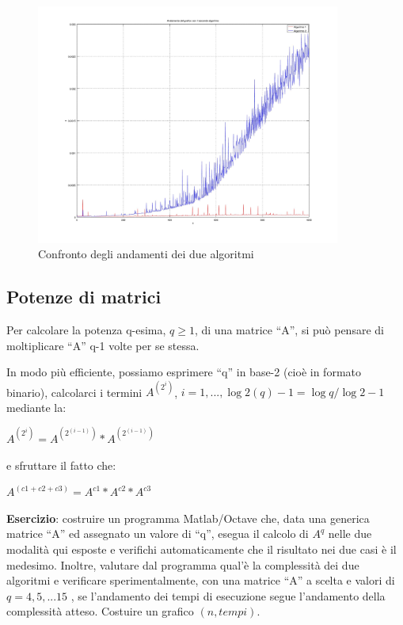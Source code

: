\begin{figure}[H]
\centering
\includegraphics[width=100mm]{../Esercitazione3/images/esercizio1c.jpg}
\caption{Confronto degli andamenti dei due algoritmi}
\label{overflow}
\end{figure}

\subsection{Potenze di matrici}

Per calcolare la potenza q-esima, $q \geq 1$, di una matrice ``A'', si può pensare di moltiplicare ``A'' q-1 volte per se stessa.

In modo più efficiente, possiamo esprimere ``q'' in base-2 (cioè in formato binario), calcolarci i termini $A^{(2^{i})}$,  $i =  1,...,\log{2(q)}-1 = \log{q}/\log{2} -1$ mediante la:

\begin{center}

$A^{(2^i)}  =  A^{(2^{(i-1)})}  *  A^{(2^{(i-1)})}$

\end{center}

e sfruttare il fatto che:

\begin{center}
$A^{(c1 + c2 + c3)}  =  A^{c1}  *  A^{c2}  *  A^{c3}$
\end{center}

\textbf{Esercizio}:  costruire un programma Matlab/Octave che, data una generica matrice ``A'' ed assegnato un valore di ``q'', esegua il calcolo di $A^q$  nelle due modalità qui esposte e verifichi automaticamente che il risultato nei due casi è il medesimo. Inoltre, valutare dal programma qual'è la complessità dei due algoritmi e verificare sperimentalmente, con una matrice ``A'' a scelta e valori di $q = 4,5,...15$ ,  se l'andamento dei tempi di esecuzione segue l'andamento della complessità atteso. Costuire un grafico $(n, tempi)$.

